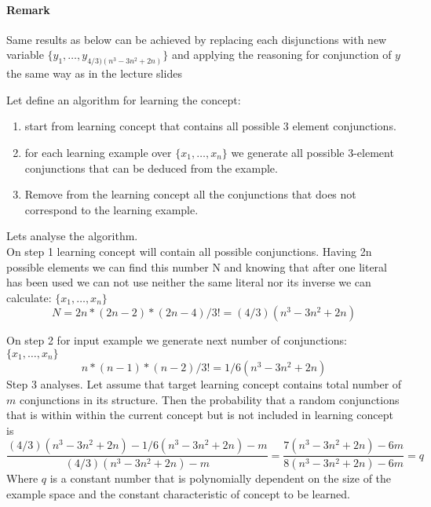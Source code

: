 \paragraph*{Remark}
Same results as below can be achieved by replacing each disjunctions with new variable $\{y_{1},\ldots,y_{4/3)(n^3-3n^2+2n)}\}$ and applying the reasoning for conjunction of $y$ the same way as in the lecture slides

Let define an algorithm for learning the concept:
\begin{enumerate}

  \item start from learning concept that contains all possible 3 element conjunctions.
  \item  for each learning example over $\{x_{1},\ldots,x_{n}\}$ we generate all possible 3-element conjunctions that can be deduced from the example.
  \item Remove from the learning concept all the conjunctions that does not correspond to the learning example.

\end{enumerate}


Lets analyse the algorithm.
\[\]
On step 1 learning concept will contain all possible conjunctions. Having 2n possible elements we can find this number N and knowing that after one literal has been used we can not use neither the same literal nor its inverse we can calculate:
$\{x_{1},\ldots,x_{n}\}$
\[
N = 2n*(2n-2)*(2n-4)/3!=(4/3)(n^3-3n^2+2n)
\]

On step 2 for input example we generate next number of conjunctions:
$\{x_{1},\ldots,x_{n}\}$
\[
n*(n-1)*(n-2)/3!=1/6(n^3-3n^2+2n)
\]
Step 3 analyses. Let assume that target learning concept contains total number of $m$ conjunctions in its  structure. Then the probability that a random conjunctions that is within within the current concept but is not included in learning concept is
\[
\frac{(4/3)(n^3-3n^2+2n) - 1/6(n^3-3n^2+2n) - m}{(4/3)(n^3-3n^2+2n) - m}  = 
\frac{7(n^3-3n^2+2n) - 6m}{8(n^3-3n^2+2n) - 6m} =q 
\] 
Where $q$ is a constant number that is polynomially dependent on the size of the example space and the constant characteristic of concept to be learned.

